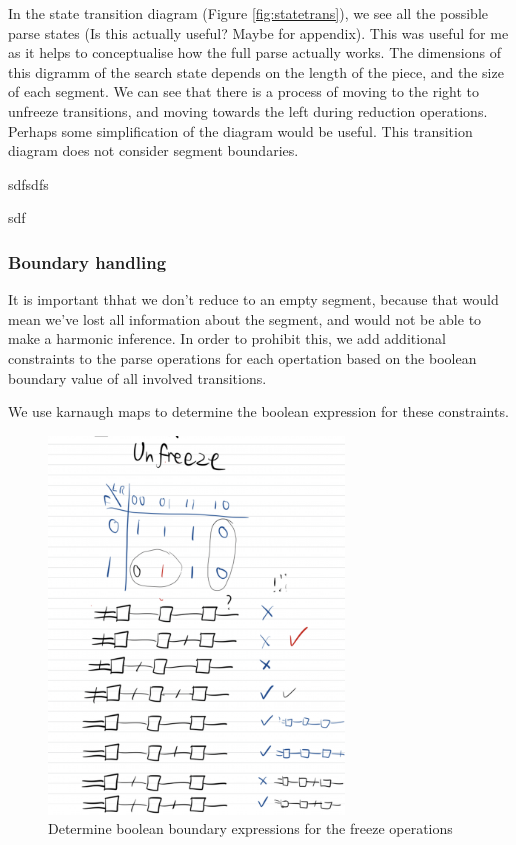 \documentclass[12pt,a4paper,twoside,openright]{report}
\theoremstyle{definition}
\begin{document}
In the state transition diagram (Figure \ref{fig:statetrans}), we see all the possible parse states (Is this actually useful? Maybe for appendix). This was useful for me as it helps to conceptualise how the full parse actually works. The dimensions of this digramm of the search state depends on the length of the piece, and the size of each segment. We can see that there is a process of moving to the right to unfreeze transitions, and moving towards the left during reduction operations. Perhaps some simplification of the diagram would be useful. This transition diagram does not consider segment boundaries.

sdfsdfs

sdf

\FloatBarrier
\subsubsection{Boundary handling}

It is important thhat we don't reduce to an empty segment, because that would mean we've lost all information about the segment, and would not be able to make a harmonic inference. In order to prohibit this, we add additional constraints to the parse operations for each opertation based on the boolean boundary value of all involved transitions.
\par
We use karnaugh maps to determine the boolean expression for these constraints.

\begin{figure}[ht]
  \centering
  \includegraphics[width=0.7\textwidth]{karnaughunfreeze}
  \caption{Determine boolean boundary expressions for the freeze operations}
  \label{fig:karnaugh}
\end{figure}
\end{document}
